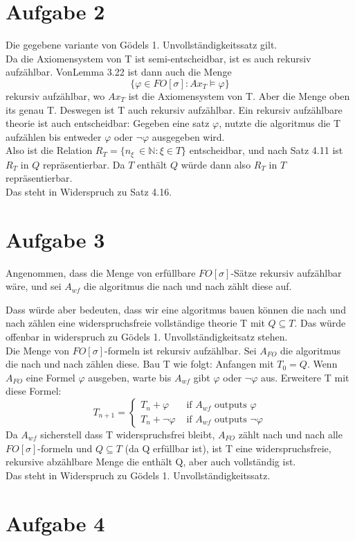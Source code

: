 \documentclass[12pt]{article}
\begin{document}
\section*{Aufgabe 2}
Die gegebene variante von Gödels 1. Unvollständigkeitssatz gilt.\\
Da die Axiomensystem von T ist semi-entscheidbar, ist es auch rekursiv aufzählbar. VonLemma 3.22 ist dann auch die Menge
\begin{equation}
\{ \varphi \in FO[\sigma] : Ax_T \models \varphi \}
\end{equation}
rekursiv aufzählbar, wo $Ax_T$ ist die Axiomensystem von T. Aber die Menge oben its genau T. Deswegen ist T auch rekursiv aufzählbar.
Ein rekursiv aufzählbare theorie ist auch entscheidbar: Gegeben eine satz $\varphi$, nutzte die algoritmus die T aufzählen bis entweder $\varphi$ oder $\neg \varphi$ ausgegeben wird.\\
Also ist die Relation $R_T = \{n_\xi\ \in \mathbb N : \xi \in T\}$ entscheidbar, und nach Satz 4.11 ist $R_T$ in $Q$ repräsentierbar. Da $T$ enthält $Q$ würde dann also $R_T$ in $T$ repräsentierbar.\\
Das steht in Widerspruch zu Satz 4.16.\\
\section*{Aufgabe 3}
Angenommen, dass die Menge von erfüllbare $FO[\sigma]$-Sätze rekursiv aufzählbar wäre, und sei $A_{wf}$ die algoritmus die nach und nach zählt diese auf.

Dass würde aber bedeuten, dass wir eine algoritmus bauen können die nach und nach zählen eine widerspruchsfreie vollständige theorie T mit $Q \subseteq T$. Das würde offenbar in widerspruch zu Gödels 1. Unvollständigkeitsatz stehen.\\
Die Menge von $FO[\sigma]$-formeln ist rekursiv aufzählbar. Sei $A_{FO}$ die algoritmus die nach und nach zählen diese.
Bau T wie folgt: Anfangen mit $T_0 = Q$. Wenn $A_{FO}$ eine Formel $\varphi$ ausgeben, warte bis $A_{wf}$ gibt $\varphi$ oder $\neg \varphi$ aus. Erweitere T mit diese Formel:
\begin{equation}
  T_{n+1} = \begin{cases}
    T_{n} + \varphi & \mbox{ if }A_{wf} \mbox{ outputs }\varphi\\
    T_{n} + \neg \varphi &\mbox{ if } A_{wf} \mbox{ outputs } \neg \varphi
  \end{cases}
\end{equation}
Da $A_{wf}$ sicherstell dass T widerspruchsfrei bleibt, $A_{FO}$ zählt nach und nach alle $FO[\sigma]$-formeln und $Q \subseteq T$ (da Q erfüllbar ist), ist T eine widerspruchsfreie, rekursive abzählbare Menge die enthält Q, aber auch vollständig ist.\\
Das steht in Widerspruch zu Gödels 1. Unvollständigkeitssatz.
\section*{Aufgabe 4}
\end{document}
